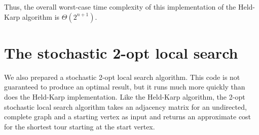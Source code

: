 \documentclass[10pt]{extarticle}
\begin{document}
Thus, the overall worst-case time complexity of this implementation of the
Held-Karp algorithm is $\Theta(2^{n+1})$. \medskip



\section{The stochastic 2-opt local search}
We also prepared a stochastic 2-opt local search algorithm. This code is not
guaranteed to produce an optimal result, but it runs much more quickly than
does the Held-Karp implementation. Like the Held-Karp algorithm, the 2-opt
stochastic local search algorithm takes an adjacency matrix for an undirected,
complete graph and a starting vertex as input and returns an approximate cost
for the shortest tour starting at the start vertex.
\end{document}
